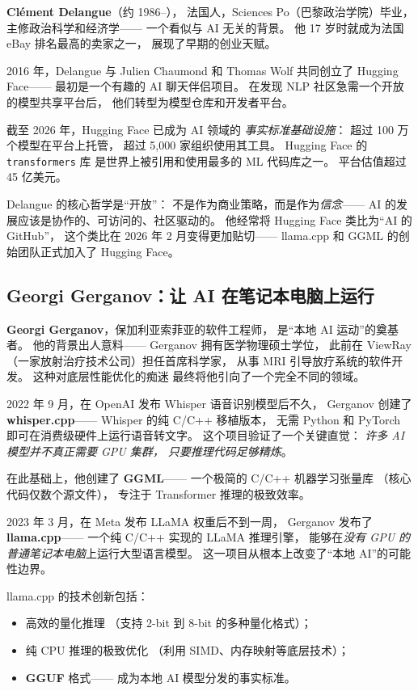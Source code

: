 \textbf{Clément Delangue}（约 1986--），
法国人，Sciences Po（巴黎政治学院）毕业，
主修政治科学和经济学——
一个看似与 AI 无关的背景。
他 17 岁时就成为法国 eBay 排名最高的卖家之一，
展现了早期的创业天赋。

2016 年，Delangue 与 Julien Chaumond 和 Thomas Wolf
共同创立了 Hugging Face——
最初是一个有趣的 AI 聊天伴侣项目。
在发现 NLP 社区急需一个开放的模型共享平台后，
他们转型为模型仓库和开发者平台。

截至 2026 年，Hugging Face 已成为 AI 领域的
\emph{事实标准基础设施}：
超过 100 万个模型在平台上托管，
超过 5,000 家组织使用其工具。
Hugging Face 的 \texttt{transformers} 库
是世界上被引用和使用最多的 ML 代码库之一。
平台估值超过 45 亿美元。

Delangue 的核心哲学是``开放''：
不是作为商业策略，而是作为\emph{信念}——
AI 的发展应该是协作的、可访问的、社区驱动的。
他经常将 Hugging Face 类比为``AI 的 GitHub''，
这个类比在 2026 年 2 月变得更加贴切——
llama.cpp 和 GGML 的创始团队正式加入了 Hugging Face。

\subsection{Georgi Gerganov：让 AI 在笔记本电脑上运行}

\textbf{Georgi Gerganov}，保加利亚索菲亚的软件工程师，
是``本地 AI 运动''的奠基者。
他的背景出人意料——
Gerganov 拥有医学物理硕士学位，
此前在 ViewRay（一家放射治疗技术公司）担任首席科学家，
从事 MRI 引导放疗系统的软件开发。
这种对底层性能优化的痴迷
最终将他引向了一个完全不同的领域。

2022 年 9 月，在 OpenAI 发布 Whisper 语音识别模型后不久，
Gerganov 创建了 \textbf{whisper.cpp}——
Whisper 的纯 C/C++ 移植版本，
无需 Python 和 PyTorch 即可在消费级硬件上运行语音转文字。
这个项目验证了一个关键直觉：
\emph{许多 AI 模型并不真正需要 GPU 集群，
只要推理代码足够精炼}。

在此基础上，他创建了 \textbf{GGML}——
一个极简的 C/C++ 机器学习张量库
（核心代码仅数个源文件），
专注于 Transformer 推理的极致效率。

2023 年 3 月，在 Meta 发布 LLaMA 权重后不到一周，
Gerganov 发布了 \textbf{llama.cpp}——
一个纯 C/C++ 实现的 LLaMA 推理引擎，
能够在\emph{没有 GPU 的普通笔记本电脑}上运行大型语言模型。
这一项目从根本上改变了``本地 AI''的可能性边界。

llama.cpp 的技术创新包括：
\begin{itemize}[noitemsep]
  \item 高效的量化推理
        （支持 2-bit 到 8-bit 的多种量化格式）；
  \item 纯 CPU 推理的极致优化
        （利用 SIMD、内存映射等底层技术）；
  \item \textbf{GGUF} 格式——
        成为本地 AI 模型分发的事实标准。
\end{itemize}

